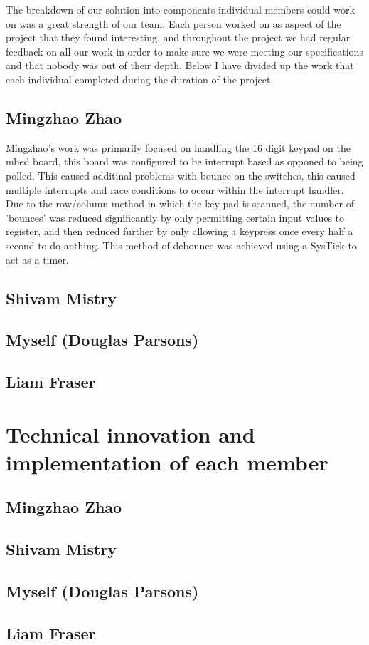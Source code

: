 The breakdown of our solution into components individual members could work on 
was a great strength of our team. Each person worked on as aspect of the project 
that they found interesting, and throughout the project we had regular feedback 
on all our work in order to make sure we were meeting our specifications and 
that nobody was out of their depth. Below I have divided up the work that each 
individual completed during the duration of the project.

\subsection*{Mingzhao Zhao}
Mingzhao's work was primarily focused on handling the 16 digit keypad on the 
mbed board, this board was configured to be interrupt based as opponed to  being 
polled. This caused additinal problems with bounce on the switches, this 
caused multiple interrupts and race conditions to occur within the interrupt 
handler. Due to the row/column method in which the key pad is scanned, the 
number of 'bounces' was reduced significantly by only permitting certain 
input values to register, and then reduced further by only allowing a keypress 
once every half a second to do anthing. This method of debounce was achieved 
using a SysTick to act as a timer. 

\subsection*{Shivam Mistry}

\subsection*{Myself (Douglas Parsons)}

\subsection*{Liam Fraser}

\section{Technical innovation and implementation of each member}

\subsection*{Mingzhao Zhao}

\subsection*{Shivam Mistry}

\subsection*{Myself (Douglas Parsons)}

\subsection*{Liam Fraser}
